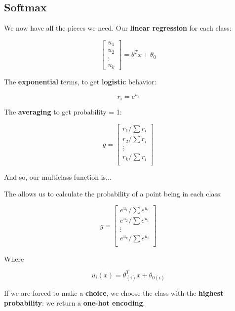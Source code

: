     \subsection*{Softmax}
        
        We now have all the pieces we need. Our \textbf{linear regression} for each class:
        
        \begin{equation}
            \begin{bmatrix}
                u_1 \\ u_2 \\ \vdots \\ u_k
            \end{bmatrix}
            = 
            \theta^T x + \theta_0
        \end{equation}
        
        The \textbf{exponential} terms, to get \textbf{logistic} behavior:
        
        \begin{equation}
            r_i = e^{u_i}
        \end{equation}
        
        The \textbf{averaging} to get probability = 1:
        
        \begin{equation}
            g = 
            \begin{bmatrix}
                r_1/\sum r_i  \\
                r_2/\sum r_i  \\
                \vdots  \\
                r_k/\sum r_i  \\
            \end{bmatrix}
        \end{equation}
        
        And so, our multiclass function is...\\
        
        \begin{definition}
            The  allows us to calculate the probability of a point being in each class:
            
            \begin{equation*}
                g = 
                \begin{bmatrix}
                    e^{u_1}/\sum e^{u_i}  \\
                    e^{u_2}/\sum e^{u_i}  \\
                    \vdots  \\
                    e^{u_k}/\sum e^{u_i}  \\
                \end{bmatrix}
            \end{equation*}
            
            Where
            
            \begin{equation}
                u_i(x) = \theta_{(i)}^T x + \theta_{0(i)}
            \end{equation}
        \end{definition}
        
        
        If we are forced to make a \textbf{choice}, we choose the class with the \textbf{highest probability}: we return a \textbf{one-hot encoding}.
    